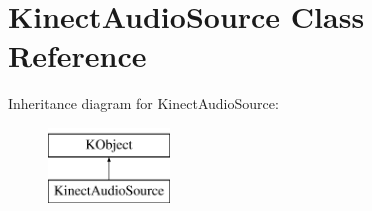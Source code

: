 \hypertarget{class_kinect_audio_source}{\section{\-Kinect\-Audio\-Source \-Class \-Reference}
\label{class_kinect_audio_source}
}
\-Inheritance diagram for \-Kinect\-Audio\-Source\-:\begin{figure}[H]
\begin{center}
\leavevmode
\includegraphics[height=2.000000cm]{class_kinect_audio_source}
\end{center}
\end{figure}
